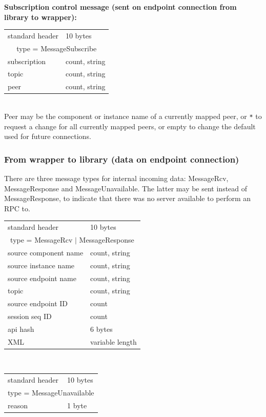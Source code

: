 \documentclass[12pt,a4paper,twoside]{article}
\renewcommand{\_}{\texttt{\symbol{95}}}
\begin{document}
\textbf{Subscription control message (sent on endpoint connection from
library to wrapper):}

\begin{tabular}{|ll|}
\hline
standard header    & 10 bytes\\
\multicolumn{2}{|c|}{type = MessageSubscribe}\\
\hline
subscription       & count, string\\
topic              & count, string\\
peer               & count, string\\
\hline
\end{tabular}\\

Peer may be the component or instance name of a currently mapped
peer, or \verb^*^ to request a change for all currently mapped peers,
or empty to change the default used for future connections.

\subsubsection{From wrapper to library (data on endpoint connection)}

There are three message types for internal incoming data: MessageRcv,
MessageResponse and MessageUnavailable. The latter may be sent instead
of MessageResponse, to indicate that there was no server available to
perform an RPC to.

\begin{tabular}{|ll|}
\hline
standard header    & 10 bytes\\
\multicolumn{2}{|c|}{type = MessageRcv $|$ MessageResponse}\\
\hline
source component name   & count, string\\
source instance name    & count, string\\
source endpoint name    & count, string\\
topic                   & count, string\\
source endpoint ID      & count\\
session seq ID     & count\\
api hash           & 6 bytes\\
XML                & variable length\\
\hline
\end{tabular}\\

\begin{tabular}{|ll|}
\hline
standard header    & 10 bytes\\
\multicolumn{2}{|c|}{type = MessageUnavailable}\\
\hline
reason             & 1 byte\\
\hline
\end{tabular}\\
\end{document}
